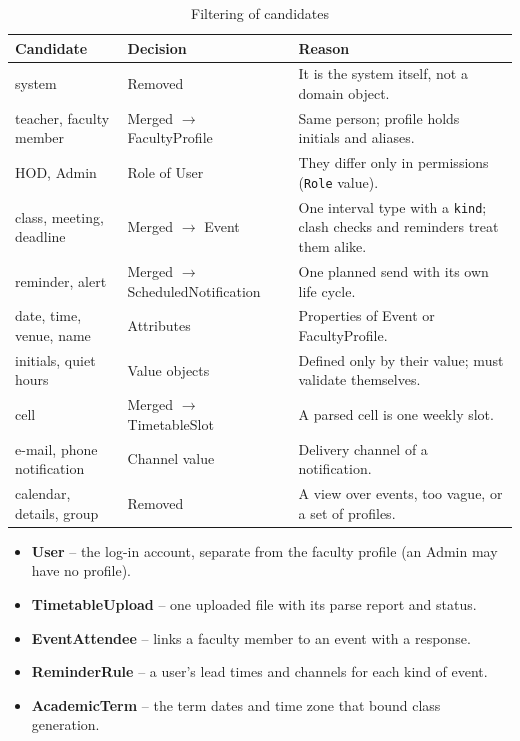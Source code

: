 \begin{xltabular}{\textwidth}{|p{3.6cm}|p{3.4cm}|Y|}
\caption{Filtering of candidates}\\
\hline
\textbf{Candidate} & \textbf{Decision} & \textbf{Reason} \\ \hline
system & Removed & It is the system itself, not a domain object. \\ \hline
teacher, faculty member & Merged $\rightarrow$ FacultyProfile & Same person; profile holds initials and aliases. \\ \hline
HOD, Admin & Role of User & They differ only in permissions (\texttt{Role} value). \\ \hline
class, meeting, deadline & Merged $\rightarrow$ Event & One interval type with a \texttt{kind}; clash checks and reminders treat them alike. \\ \hline
reminder, alert & Merged $\rightarrow$ ScheduledNotification & One planned send with its own life cycle. \\ \hline
date, time, venue, name & Attributes & Properties of Event or FacultyProfile. \\ \hline
initials, quiet hours & Value objects & Defined only by their value; must validate themselves. \\ \hline
cell & Merged $\rightarrow$ TimetableSlot & A parsed cell is one weekly slot. \\ \hline
e-mail, phone notification & Channel value & Delivery channel of a notification. \\ \hline
calendar, details, group & Removed & A view over events, too vague, or a set of profiles. \\ \hline
\end{xltabular}

\begin{itemize}
  \item \textbf{User} -- the log-in account, separate from the faculty profile (an Admin may have no profile).
  \item \textbf{TimetableUpload} -- one uploaded file with its parse report and status.
  \item \textbf{EventAttendee} -- links a faculty member to an event with a response.
  \item \textbf{ReminderRule} -- a user's lead times and channels for each kind of event.
  \item \textbf{AcademicTerm} -- the term dates and time zone that bound class generation.
\end{itemize}


